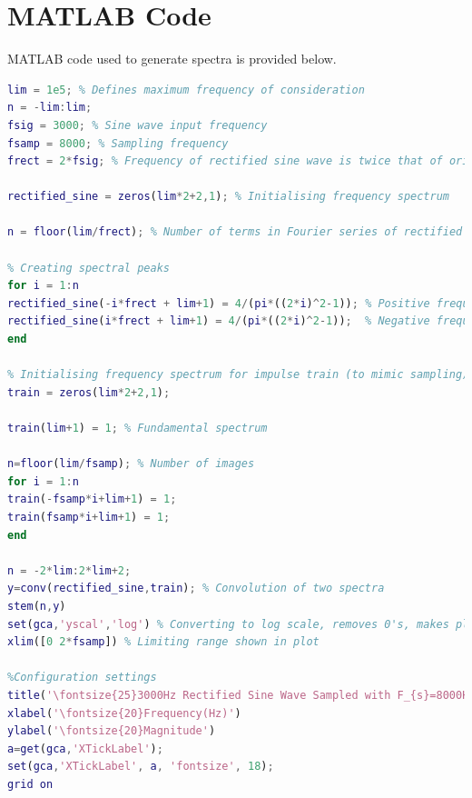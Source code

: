 \documentclass{article}
\begin{document}
\newpage
\section{MATLAB Code}

MATLAB code used to generate spectra is provided below. 

\begin{lstlisting}[language=Matlab, frame=single, caption=Matlab code to generate frequency spectrum for a (sampled) rectified sinewave, label = lst:mat_ting]
lim = 1e5; % Defines maximum frequency of consideration
n = -lim:lim;
fsig = 3000; % Sine wave input frequency
fsamp = 8000; % Sampling frequency
frect = 2*fsig; % Frequency of rectified sine wave is twice that of original signal

rectified_sine = zeros(lim*2+2,1); % Initialising frequency spectrum

n = floor(lim/frect); % Number of terms in Fourier series of rectified sine wave

% Creating spectral peaks
for i = 1:n
rectified_sine(-i*frect + lim+1) = 4/(pi*((2*i)^2-1)); % Positive frequency term
rectified_sine(i*frect + lim+1) = 4/(pi*((2*i)^2-1));  % Negative frequency term
end

% Initialising frequency spectrum for impulse train (to mimic sampling)
train = zeros(lim*2+2,1); 

train(lim+1) = 1; % Fundamental spectrum

n=floor(lim/fsamp); % Number of images
for i = 1:n
train(-fsamp*i+lim+1) = 1;
train(fsamp*i+lim+1) = 1;
end

n = -2*lim:2*lim+2;
y=conv(rectified_sine,train); % Convolution of two spectra
stem(n,y)
set(gca,'yscal','log') % Converting to log scale, removes 0's, makes plot clear
xlim([0 2*fsamp]) % Limiting range shown in plot

%Configuration settings
title('\fontsize{25}3000Hz Rectified Sine Wave Sampled with F_{s}=8000Hz')
xlabel('\fontsize{20}Frequency(Hz)')
ylabel('\fontsize{20}Magnitude')
a=get(gca,'XTickLabel');
set(gca,'XTickLabel', a, 'fontsize', 18);
grid on
\end{lstlisting}
\end{document}
